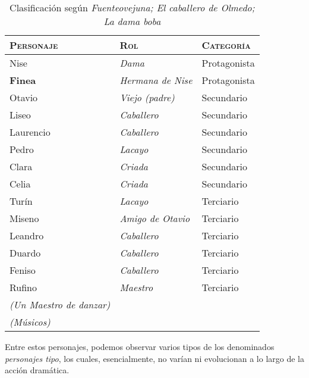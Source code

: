 \documentclass[12pt,a4paper]{article}
\begin{document}
\begin{table}[h]
	\centering
	\begin{tabular}{| m{5cm} | m{5cm} | m{5cm} |}
		\hline
		\textsc{Personaje}			 		& \textsc{Rol}								& \textsc{Categoría}			\\\hline
		\hline
		Nise 								& \textit{Dama}								& Protagonista 					\\\hline
		\textbf{Finea}						& \textit{Hermana de Nise}					& Protagonista 					\\\hline
		Otavio								& \textit{Viejo (padre)}	 				& Secundario 					\\\hline
		Liseo 								& \textit{Caballero}						& Secundario 					\\\hline
		Laurencio							& \textit{Caballero}						& Secundario 					\\\hline
		Pedro 								& \textit{Lacayo}							& Secundario 					\\\hline
		Clara 								& \textit{Criada}							& Secundario 					\\\hline
		Celia 								& \textit{Criada}							& Secundario 					\\\hline
		Turín 								& \textit{Lacayo}							& Terciario 					\\\hline
		Miseno 								& \textit{Amigo de Otavio} 					& Terciario 					\\\hline
		Leandro 							& \textit{Caballero} 						& Terciario 					\\\hline
		Duardo 								& \textit{Caballero} 						& Terciario 					\\\hline
		Feniso 								& \textit{Caballero}						& Terciario 					\\\hline
		Rufino								& \textit{Maestro} 							& Terciario 					\\\hline
		\textit{(Un Maestro de danzar)}		& 											&								\\\hline
		\textit{(Músicos)}					&											&								\\\hline
	\end{tabular}
	\caption{Clasificación según \textit{Fuenteovejuna; El caballero de Olmedo; La dama boba}\protect\footnotemark}
	\label{tab:1}
\end{table}

Entre estos personajes, podemos observar varios tipos de los denominados \textit{personajes tipo}, los cuales, esencialmente, no varían ni evolucionan a lo largo de la acción dramática.\\
\end{document}
